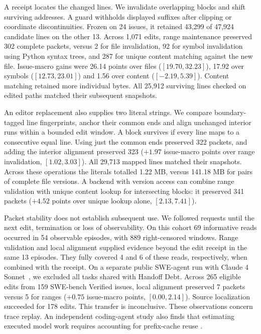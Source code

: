\documentclass[conference]{IEEEtran}
\begin{document}
A receipt locates the changed lines. We invalidate overlapping blocks and shift surviving addresses. A guard withholds displayed suffixes after clipping or coordinate discontinuities. Frozen on 24 issues, it retained 43,299 of 47,924 candidate lines on the other 13. Across 1,071 edits, range maintenance preserved 302 complete packets, versus 2 for file invalidation, 92 for symbol invalidation using Python syntax trees, and 287 for unique content matching against the new file. Issue-macro gains were 26.14 points over files ($[19.70,32.23]$), 17.92 over symbols ($[12.73,23.01]$) and 1.56 over content ($[-2.19,5.39]$). Content matching retained more individual bytes. All 25,912 surviving lines checked on edited paths matched their subsequent snapshots. 

An editor replacement also supplies two literal strings. We compare boundary-tagged line fingerprints, anchor their common ends and align unchanged interior runs within a bounded edit window. A block survives if every line maps to a consecutive equal line. Using just the common ends preserved 322 packets, and adding the interior alignment preserved 323 ($+1.97$ issue-macro points over range invalidation, $[1.02,3.03]$). All 29,713 mapped lines matched their snapshots. Across these operations the literals totalled 1.22 MB, versus 141.18 MB for pairs of complete file versions. A backend with version access can combine range validation with unique content lookup for intersecting blocks: it preserved 341 packets ($+4.52$ points over unique lookup alone, $[2.13,7.41]$).

Packet stability does not establish subsequent use. We followed requests until the next edit, termination or loss of observability. On this cohort 69 informative reads occurred in 54 observable episodes, with 889 right-censored windows. Range validation and local alignment supplied evidence beyond the edit receipt in the same 13 episodes. They fully covered 4 and 6 of these reads, respectively, when combined with the receipt. On a separate public SWE-agent run with Claude 4 Sonnet~\cite{swe-run}, we excluded all tasks shared with Handoff Debt. Across 265 eligible edits from 159 SWE-bench Verified issues, local alignment preserved 7 packets versus 5 for ranges ($+0.75$ issue-macro points, $[0.00,2.14]$). Source localization succeeded for 178 edits. This transfer is inconclusive. These observations concern trace replay. An independent coding-agent study also finds that estimating executed model work requires accounting for prefix-cache reuse \cite{physical}.
\end{document}
